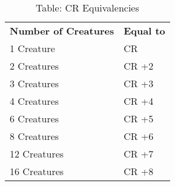 \begin{table}[]
\sffamily
\caption{Table: CR Equivalencies}
\begin{tabular}{ll}
\textbf{Number of Creatures} & \textbf{Equal to}\\
1 Creature & CR \\
 2 Creatures & CR +2 \\
 3 Creatures & CR +3 \\
 4 Creatures & CR +4 \\
 6 Creatures & CR +5 \\
 8 Creatures & CR +6 \\
 12 Creatures & CR +7 \\
 16 Creatures & CR +8\\
\end{tabular}
\end{table}

